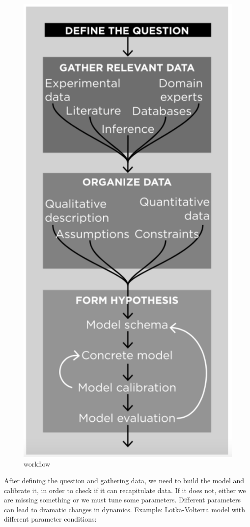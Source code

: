 \begin{figure}
\centering
\includegraphics{workflow.png}
\caption{workflow}
\end{figure}

After defining the question and gathering data, we need to build the
model and calibrate it, in order to check if it can recapitulate data.
If it does not, either we are missing something or we must tune some
parameters. Different parameters can lead to dramatic changes in
dynamics. Example: Lotka-Volterra model with different parameter
conditions:

